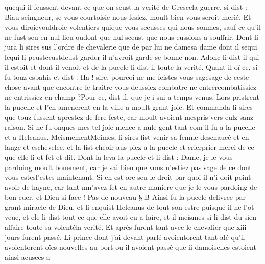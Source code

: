 \documentclass{article}
\begin{document}
\begin{pages}
   quequi il feussent devant ce que on seust la verité de
   Grescela guerre, si dist :
   Biau seingneur, se vous courtoisie nous fesiez,
      moult bien vous seroit merié. Et vous diroievouldroie
      volentiers
      quique vous sceusses qui nous sonmes, sauf ce 
      qu’il ne fust seu en 
                     nul lieu 
         oudont
                      que nul sceust que 
                  nous eussions a souffrir.
   Dont li jura li sires sus l’ordre de chevalerie que de 
   par lui ne 
               damesa dame 
               dont il sequi lequi li
               peustceustdeust garder il n’avroit garde se 
   bonne non. Adonc li dist il qui il estoit et dont il venoit et de 
      la pucele li dist il toute la verité. Quant il oï ce, si fu touz esbahis et dist :
   Ha ! sire, pourcoi ne me feistes vous 
      sagesage de ceste chose avant que
      encontre le traitre vous 
      deussiez combatre ne entrercombatissiez ne entrissiez en champ ?Pour ce, dist il, que je i sui a temps venus. \pend
\pstart Lors pristrent la pucelle et 
   l’en amenerent en la ville a moult grant joie. 
   Et commanda li sires que touz fussent aprestez de fere feste, 
   car moult avoient mespris vers eulz sanz raison. 
   Si ne fu onques mes tel joie menee a nule gent tant com il fu a la pucelle et 
   a Helcanus. 
   MeismementMeimes, li sires 
   fist venir sa fenme deschaucé 
   et en lange et eschevelee, 
   et la fist cheoir aus piez a 
   la pucele et 
   crierprier merci de ce que elle li ot fet et dit. 
   Dont la leva la pucele et 
   li dist :
   Dame, je le vous pardoing moult bonement, 
      car je sai bien que vous n’estiez pas sage de ce dont vous estesl'estes 
       maintenant. 
   Si en est ore seu le droit par quoi il n’i doit point avoir de hayne, 
   car tant mn’avez 
      fet en autre maniere que je le vous pardoing de bon cuer, et Dieu si face ! \pend
            \pstart Pas de nouveau § B
               Ainsi fu la pucele delivree 
               par grant miracle de Dieu, et li enquist Helcanus 
               de tout son estre puisque il ne l’ot veue, et ele li dist 
               tout 
                  ce que elle avoit eu a faire,
               et il meismes si li dist du sien affaire toute 
                  sa volentéla verité. 
               Et aprés furent tant avec le chevalier que 
               xiii jours furent passé. 
               Li prince dont j’ai devant parlé avoientorent
               tant alé 
               qu’il avoientorent 
               oïes nouvelles au port ou il avoient passé 
               que ii damoiselles estoient ainsi acusees a 

\end{pages}
\end{document}
